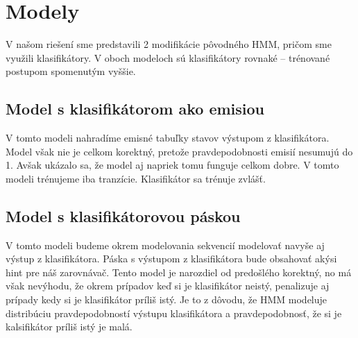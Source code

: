 \chapter{Modely}

V našom riešení sme predstavili 2 modifikácie pôvodného HMM, pričom sme využili klasifikátory. V oboch modeloch sú klasifikátory rovnaké – trénované postupom spomenutým vyššie.

\section{Model s klasifikátorom ako emisiou}
V tomto modeli nahradíme emisné tabuľky stavov výstupom z klasifikátora. Model však nie je celkom korektný, pretože pravdepodobnosti emisií nesumujú do 1. Avšak ukázalo sa, že model aj napriek tomu funguje celkom dobre.
V tomto modeli trénujeme iba tranzície. Klasifikátor sa trénuje zvlášť.
\section{Model s klasifikátorovou páskou}
V tomto modeli budeme okrem modelovania sekvencií modelovať navyše aj výstup z klasifikátora. Páska s výstupom z klasifikátora bude obsahovať akýsi hint pre náš zarovnávač. Tento model je narozdiel od predošlého korektný, no má však nevýhodu, že okrem prípadov keď si je klasifikátor neistý, penalizuje aj prípady kedy si je klasifikátor príliš istý. Je to z dôvodu, že HMM modeluje distribúciu pravdepodobností výstupu klasifikátora a pravdepodobnosť, že si je kalsifikátor príliš istý je malá.
